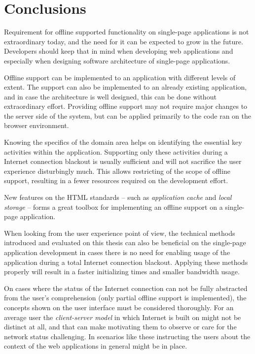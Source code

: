 
\chapter{Conclusions}

Requirement for offline supported functionality on single-page applications is not extraordinary today, and the need for it can be expected to grow in the future. Developers should keep that in mind when developing web applications and especially when designing software architecture of single-page applications.

Offline support can be implemented to an application with different levels of extent. The support can also be implemented to an already existing application, and in case the architecture is well designed, this can be done without extraordinary effort. Providing offline support may not require major changes to the server side of the system, but can be applied primarily to the code ran on the browser environment.

Knowing the specifics of the domain area helps on identifying the essential key activities within the application. Supporting only these activities during a Internet connection blackout is usually sufficient and will not sacrifice the user experience disturbingly much. This allows restricting of the scope of offline support, resulting in a fewer resources required on the development effort.

New features on the HTML standards -- such as \textit{application cache} and \textit{local storage} -- forms a great toolbox for implementing an offline support on a single-page application.

When looking from the user experience point of view, the technical methods introduced and evaluated on this thesis can also be beneficial on the single-page application development in cases there is no need for enabling usage of the application during a total Internet connection blackout. Applying these methods properly will result in a faster initializing times and smaller bandwidth usage.

On cases where the status of the Internet connection can not be fully abstracted from the user's comprehension (only partial offline support is implemented), the concepts shown on the user interface must be considered thoroughly. For an average user the \textit{client-server model} in which Internet is built on might not be distinct at all, and that can make motivating them to observe or care for the network status challenging. In scenarios like these instructing the users about the context of the web applications in general might be in place.


